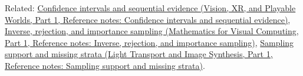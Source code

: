 Related: \href{../07-Vision-XR-and-Playable-Worlds-P01/main.pdf\#nameddest=appendix-c83016554b1e}{Confidence intervals and sequential evidence (Vision, XR, and Playable Worlds, Part 1, Reference notes: Confidence intervals and sequential evidence)}, \href{../02-Mathematics-for-Visual-Computing-P01/main.pdf\#nameddest=appendix-8d863ed954d0}{Inverse, rejection, and importance sampling (Mathematics for Visual Computing, Part 1, Reference notes: Inverse, rejection, and importance sampling)}, \href{../04-Light-Transport-and-Image-Synthesis-P01/main.pdf\#nameddest=appendix-10308c3d753e}{Sampling support and missing strata (Light Transport and Image Synthesis, Part 1, Reference notes: Sampling support and missing strata)}.
